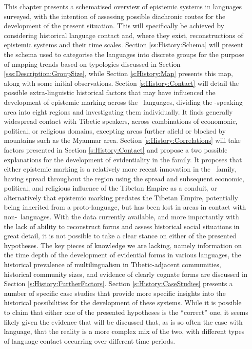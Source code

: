 This chapter presents a schematised overview of epistemic systems in languages surveyed, with the intention of assessing possible diachronic routes for the development of the present situation. This will specifically be achieved by considering historical language contact and, where they exist, reconstructions of epistemic systems and their time scales. Section \ref{ss:History:Schema} will present the schema used to categorise the languages into discrete groups for the purpose of mapping trends based on typologies discussed in Section \ref{sss:Description:GroupSize}, while Section \ref{s:History:Map} presents this map, along with some initial observations. Section \ref{s:History:Contact} will detail the possible extra-linguistic historical factors that may have influenced the development of epistemic marking across the \lfam\ languages, dividing the \lfam-speaking area into eight regions and investigating them individually. It finds generally widespread contact with Tibetic speakers, across combinations of economonic, political, or religious domains, excepting areas further afield or blocked by mountains such as the Myanmar area. Section \ref{s:History:Correlations} will take factors presented in Section \ref{s:History:Contact} and propose a two possible explanations for the development of evidentiality in the family. It proposes that either epistemic marking is a relatively more recent innovation in the \lfam\ family, having spread throughout the region using the spread and subsequent economic, political, and religious influence of the Tibetan Empire as a conduit, or alternatively that epistemic marking predates the Tibetan Empire, potentially being inherited from a proto-language, but has been lost in areas in contact with non-\lfam\ languages. With the data currently available, and more importantly with the lack of ability to reconstruct forms and assess historical social situations in great detail, it is not possible to take a clear stance on either of the presented hypotheses. The key pieces of knowledge we are lacking, namely information on the time depth of the development of evidential forms in various languages, the historical prevalence of multilingualism in Tibetic-adjacent communities, historical community sizes, and evidence of clearly cognate forms are discussed in Section \ref{s:History:FurtherFactors}. Section \ref{s:History:CaseStudies} presents a number of specific case studies that provide more specific insights into the historical possibilities for the development of these systems. While it is possible to claim that either one of the presented hypotheses is the ``correct'' one, it seems likely given the evidence that will be discussed that, as is so often the case with language, that the reality is a more complex mix of the two, with different types of language contact occurring over different time periods.


